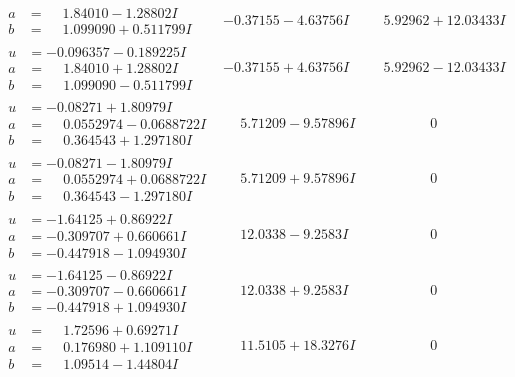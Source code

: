 \documentclass[1p]{elsarticle_modified}
\theoremstyle{definition}
\begin{document}
$$\begin{array}{c|c|c}
\begin{aligned}
a &= \phantom{-}1.84010 - 1.28802 I \\
b &= \phantom{-}1.099090 + 0.511799 I\end{aligned}
 & -0.37155 - 4.63756 I & \phantom{-}5.92962 + 12.03433 I \\ \hline\begin{aligned}
u &= -0.096357 - 0.189225 I \\
a &= \phantom{-}1.84010 + 1.28802 I \\
b &= \phantom{-}1.099090 - 0.511799 I\end{aligned}
 & -0.37155 + 4.63756 I & \phantom{-}5.92962 - 12.03433 I \\ \hline\begin{aligned}
u &= -0.08271 + 1.80979 I \\
a &= \phantom{-}0.0552974 - 0.0688722 I \\
b &= \phantom{-}0.364543 + 1.297180 I\end{aligned}
 & \phantom{-}5.71209 - 9.57896 I & \phantom{-0.000000 } 0 \\ \hline\begin{aligned}
u &= -0.08271 - 1.80979 I \\
a &= \phantom{-}0.0552974 + 0.0688722 I \\
b &= \phantom{-}0.364543 - 1.297180 I\end{aligned}
 & \phantom{-}5.71209 + 9.57896 I & \phantom{-0.000000 } 0 \\ \hline\begin{aligned}
u &= -1.64125 + 0.86922 I \\
a &= -0.309707 + 0.660661 I \\
b &= -0.447918 - 1.094930 I\end{aligned}
 & \phantom{-}12.0338 - 9.2583 I & \phantom{-0.000000 } 0 \\ \hline\begin{aligned}
u &= -1.64125 - 0.86922 I \\
a &= -0.309707 - 0.660661 I \\
b &= -0.447918 + 1.094930 I\end{aligned}
 & \phantom{-}12.0338 + 9.2583 I & \phantom{-0.000000 } 0 \\ \hline\begin{aligned}
u &= \phantom{-}1.72596 + 0.69271 I \\
a &= \phantom{-}0.176980 + 1.109110 I \\
b &= \phantom{-}1.09514 - 1.44804 I\end{aligned}
 & \phantom{-}11.5105 + 18.3276 I & \phantom{-0.000000 } 0 \\ \hline\begin{aligned}

\end{aligned}
\end{array}$$
\end{document}
